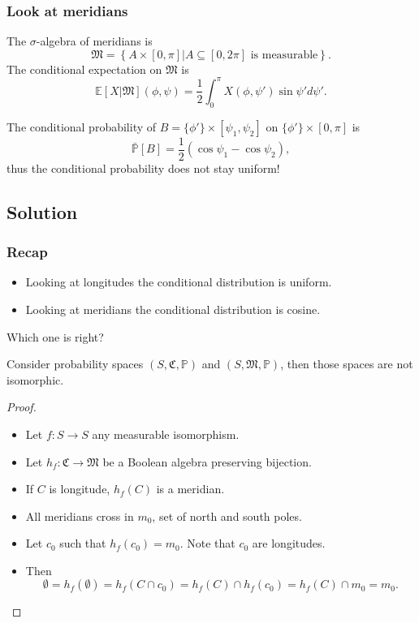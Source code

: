 \documentclass{beamer}
\theoremstyle{plain}
\theoremstyle{definition}
\theoremstyle{remark}
\renewcommand{\P}{\mathbb{P}}
\newcommand{\E}{\mathbb{E}}
\newcommand{\1}{\mathbbm{1}}
\begin{document}
\begin{frame}
\frametitle{Look at meridians}
The $\sigma$-algebra of meridians is 
\[\mathfrak{M}=\left\{A\times [0,\pi]|A\subseteq[0,2\pi]\text{ is measurable}\right\}.\]
The conditional expectation on $\mathfrak{M}$ is
\[\E[X|\mathfrak{M}](\phi,\psi)=\frac{1}{2}\int_0^{\pi}X(\phi,\psi')\sin\psi'd\psi'.\]
\pause

The conditional probability of $B=\{\phi'\}\times[\psi_1,\psi_2]$ on $\{\phi'\}\times[0,\pi]$ is
\[\bar{\P}[B]=\frac{1}{2}(\cos\psi_1-\cos\psi_2),\]
thus the conditional probability does not stay uniform! 
\end{frame}

\subsection*{Solution}
\begin{frame}
\frametitle{Recap}

\begin{itemize}
\item Looking at longitudes the conditional distribution is uniform.
\item Looking at meridians the conditional distribution is cosine.
\end{itemize}

Which one is right?
\end{frame}

\begin{frame}
\begin{theorem}
Consider probability spaces $(S,\mathfrak{C},\P)$ and $(S,\mathfrak{M},\P)$, then those spaces are not isomorphic.
\end{theorem}\pause
\begin{proof}
\begin{itemize}
	\item Let $f\colon S\to S$ any measurable isomorphism.
	\item Let $h_f\colon\mathfrak{C}\to\mathfrak{M}$ be a Boolean algebra preserving bijection.
	\item If $C$ is longitude, $h_f(C)$ is a meridian.
	\item All meridians cross in $m_0$, set of north and south poles.
	\item Let $c_0$ such that $h_f(c_0)=m_0$. Note that $c_0$ are longitudes.
	\item Then
	\[\emptyset=h_f(\emptyset)=h_f(C\cap c_0)=h_f(C)\cap h_f(c_0)=h_f(C)\cap m_0=m_0.\]
\end{itemize}
\end{proof}
\end{frame}
\end{document}
